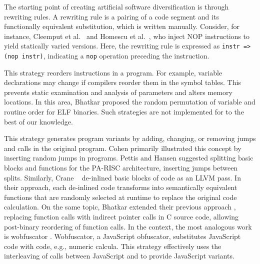 \begin{strategy}
    \label{rewriting_strategy}
    The starting point of creating artificial software diversification is through rewriting rules.
    A rewriting rule is a pairing of a code segment and its functionally equivalent substitution, which is written manually. 
    Consider, for instance, Cleemput et al.~\cite{Cleemput2012} and Homescu et al.~\cite{homescu2013profile}, who inject NOP instructions to yield statically varied versions. 
    Here, the rewriting rule is expressed as \texttt{instr => (nop instr)}, indicating a \texttt{nop} operation preceding the instruction.
\end{strategy}



\begin{strategy}
    \label{instruction_reordering}
    This strategy reorders instructions in a program.
    For example, variable declarations may change if compilers reorder them in the symbol tables. 
    This prevents static examination and analysis of parameters and alters memory locations. 
    In this area, Bhatkar \etal \cite{bhatkar03, bhatkar2005efficient} proposed the random permutation of variable and routine order for ELF binaries.
    Such strategies are not implemented for \Wasm to the best of our knowledge.
\end{strategy}


\begin{strategy}
    \label{jumps}
    This strategy generates program variants by adding, changing, or removing jumps and calls in the original program. 
    Cohen \cite{cohen1993operating} primarily illustrated this concept by inserting random jumps in programs. Pettis and Hansen \cite{pettisochhansen} suggested splitting basic blocks and functions for the PA-RISC architecture, inserting jumps between splits.
    Similarly, Crane \etal~\cite{crane2015thwarting} de-inlined basic blocks of code as an LLVM pass. 
    In their approach, each de-inlined code transforms into semantically equivalent functions that are randomly selected at runtime to replace the original code calculation. 
    On the same topic, Bhatkar \etal \cite{bhatkar2005efficient} extended their previous approach \cite{bhatkar03}, replacing function calls with indirect pointer calls in C source code, allowing post-binary reordering of function calls. 
    In the \Wasm context, the most analogous work is wobfuscator \cite{wobfuscator}.
    Wobfuscator, a JavaScript obfuscator, substitutes JavaScript code with \Wasm code, e.g., numeric calcula.
    This strategy effectively uses the interleaving of calls between JavaScript and \Wasm to provide JavaScript variants.
\end{strategy}


